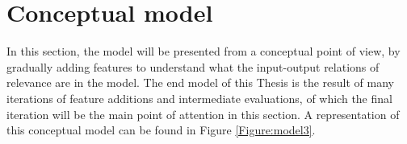 \section{Conceptual model} \label{Concept}
In this section, the model will be presented from a conceptual point of view, by gradually adding features to understand what the input-output relations of relevance are in the model. The end model of this Thesis is the result of many iterations of feature additions and intermediate evaluations, of which the final iteration will be the main point of attention in this section. A representation of this conceptual model can be found in Figure \ref{Figure:model3}.
